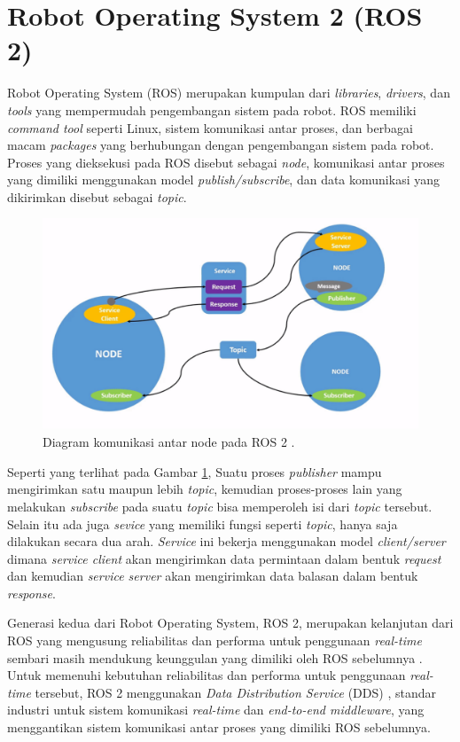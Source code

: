 \section{Robot Operating System 2 (ROS 2)}
\label{sec:robotoperatingsystem}

Robot Operating System (ROS) \citep{cit:quigley2009} merupakan kumpulan dari \emph{libraries}, \emph{drivers}, dan \emph{tools} yang mempermudah pengembangan sistem pada robot.
ROS memiliki \emph{command tool} seperti Linux, sistem komunikasi antar proses, dan berbagai macam \emph{packages} yang berhubungan dengan pengembangan sistem pada robot.
Proses yang dieksekusi pada ROS disebut sebagai \emph{node}, komunikasi antar proses yang dimiliki menggunakan model \emph{publish/subscribe}, dan data komunikasi yang dikirimkan disebut sebagai \emph{topic}.

\begin{figure} [ht]
  \centering
	\includegraphics[scale=0.4]{gambar/komunikasi-ros.png}
	\caption{Diagram komunikasi antar node pada ROS 2 \citep{url:ros2nodes}.}
	\label{fig:komunikasiros}
\end{figure}

Seperti yang terlihat pada Gambar \ref{fig:komunikasiros}, Suatu proses \emph{publisher} mampu mengirimkan satu maupun lebih \emph{topic}, kemudian proses-proses lain yang melakukan \emph{subscribe} pada suatu \emph{topic} bisa memperoleh isi dari \emph{topic} tersebut.
Selain itu ada juga \emph{sevice} yang memiliki fungsi seperti \emph{topic}, hanya saja dilakukan secara dua arah.
\emph{Service} ini bekerja menggunakan model \emph{client/server} dimana \emph{service client} akan mengirimkan data permintaan dalam bentuk \emph{request} dan kemudian \emph{service server} akan mengirimkan data balasan dalam bentuk \emph{response}.

Generasi kedua dari Robot Operating System, ROS 2, merupakan kelanjutan dari ROS yang mengusung reliabilitas dan performa untuk penggunaan \emph{real-time} sembari masih mendukung keunggulan yang dimiliki oleh ROS sebelumnya \citep{cit:maruyama2016}.
Untuk memenuhi kebutuhan reliabilitas dan performa untuk penggunaan \emph{real-time} tersebut, ROS 2 menggunakan \emph{Data Distribution Service} (DDS) \citep{cit:castellote2003} \citep{cit:schlesselman2004}, standar industri untuk sistem komunikasi \emph{real-time} dan \emph{end-to-end middleware}, yang menggantikan sistem komunikasi antar proses yang dimiliki ROS sebelumnya.
